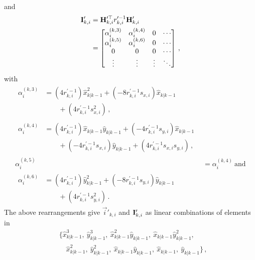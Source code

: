 and
\begin{equation}
    \begin{split}
        {\ensuremath{{\mathbf{I}}}}'_{k,i} &= {{\mathbf{H}}}_{k,i}^{\prime\top} r_{k,i}^{\prime-1}{{\mathbf{H}}}'_{k,i} \\
        &=
        \begin{bmatrix}
            \alpha_i^{(k,3)} & \alpha_i^{(k,4)} & 0 & \cdots \\
            \alpha_i^{(k,5)} & \alpha_i^{(k,6)} & 0 & \cdots\\
            0 & 0 & 0 & \cdots \\
            \vdots & \vdots & \vdots & \ddots
        \end{bmatrix}\,,
    \end{split} \label{eqn:hrh_linear_comb}
\end{equation}
with
\begin{align*}
    \begin{split}
        \alpha_i^{(k,3)} &= (4r_{k,i}^{\prime-1})\hat{x}_{k|k-1}^2 + (-8r_{k,i}^{\prime-1}s_{x,i})\hat{x}_{k|k-1} \\
        &\qquad+ (4r_{k,i}^{\prime-1}s_{x,i}^2)\,,
    \end{split}\\
    \begin{split}
        \alpha_i^{(k,4)} &= (4r_{k,i}^{\prime-1})\hat{x}_{k|k-1}\hat{y}_{k|k-1} + (-4r_{k,i}^{\prime-1}s_{y,i})\hat{x}_{k|k-1}  \\
        &\qquad+ (-4r_{k,i}^{\prime-1}s_{x,i})\hat{y}_{k|k-1} + (4r_{k,i}^{\prime-1}s_{x,i}s_{y,i})\,,
    \end{split}\\
    \alpha_i^{(k,5)} &= \alpha_i^{(k,4)}\ \textrm{and} \\
    \begin{split}
        \alpha_i^{(k,6)} &= (4r_{k,i}^{\prime-1})\hat{y}_{k|k-1}^2 + (-8r_{k,i}^{\prime-1}s_{y,i})\hat{y}_{k|k-1} \\
        &\qquad+ (4r_{k,i}^{\prime-1}s_{y,i}^2)\,.
    \end{split}
\end{align*}
The above rearrangements give $\vec{i}'_{k,i}$ and ${{\mathbf{I}}}'_{k,i}$ as linear combinations of elements in
\begin{equation}
    \begin{split}
        &\{ \hat{x}_{k|k-1}^3,\ \hat{y}_{k|k-1}^3,\ \hat{x}_{k|k-1}^2\hat{y}_{k|k-1},\ \hat{x}_{k|k-1}\hat{y}_{k|k-1}^2,\\
        &\quad \hat{x}_{k|k-1}^2,\ \hat{y}_{k|k-1}^2,\ \hat{x}_{k|k-1}\hat{y}_{k|k-1},\ \hat{x}_{k|k-1},\ \hat{y}_{k|k-1}\}\,,
    \end{split} \label{eqn:weights_to_broadcast}
\end{equation}
